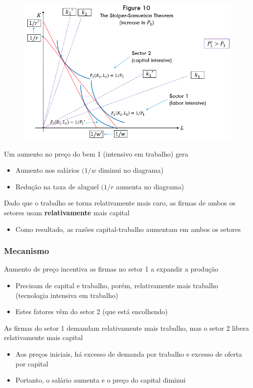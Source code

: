 \documentclass[a4paper,12pt]{article}[abntex2]
\begin{document}
\begin{figure}[H]
    \centering
    \includegraphics[width=0.7\linewidth]{Imagens/a10i10.png}
\end{figure}

Um aumento no preço do bem 1 (intensivo em trabalho) gera\begin{itemize}
    \item Aumento nos salários \((1/w\) diminui no diagrama)
    \item Redução na taxa de aluguel \((1/r\) aumenta no diagrama)
\end{itemize}

Dado que o trabalho se torna relativamente mais caro, as firmas de ambos os setores usam \textbf{relativamente} mais capital\begin{itemize}
    \item Como resultado, as razões capital-trabalho aumentam em ambos os setores
\end{itemize}

\subsubsection{\textbf{Mecanismo}}
Aumento de preço incentiva as firmas no setor 1 a expandir a produção\begin{itemize}
    \item Precisam de capital e trabalho, porém, relativamente mais trabalho (tecnologia intensiva em trabalho)
    \item Estes fatores vêm do setor 2 (que está encolhendo)
\end{itemize}

As firmas do setor 1 demandam relativamente mais trabalho, mas o setor 2 libera relativamente mais capital\begin{itemize}
    \item Aos preços iniciais, há excesso de demanda por trabalho e excesso de oferta por capital
    \item Portanto, o salário aumenta e o preço do capital diminui
\end{itemize}
\end{document}
